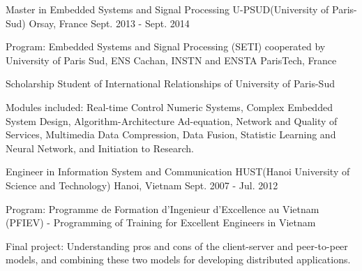 \begin{cventries}
{\begin{cvitems}
{		%
	} 
	\end{cvitems}
}

\cventry
{Master in Embedded Systems and Signal Processing} %
{U-PSUD(University of Paris-Sud)} %
{Orsay, France} %
{Sept. 2013 - Sept. 2014} %
{ %
	\begin{cvitems}
		\item {Program: Embedded Systems and Signal Processing (SETI) cooperated by University of Paris Sud, ENS Cachan, INSTN and ENSTA ParisTech, France}		
		\item {Scholarship Student of International Relationships of University of Paris-Sud}
		\item {Modules included: Real-time Control Numeric Systems, Complex Embedded System Design, Algorithm-Architecture Ad-equation, Network and Quality of Services, Multimedia Data Compression, Data Fusion, Statistic Learning and Neural Network, and Initiation to Research.}
	\end{cvitems}
}


\cventry
{Engineer in Information System and Communication} %
{HUST(Hanoi University of Science and Technology)} %
{Hanoi, Vietnam} %
{Sept. 2007 - Jul. 2012} %
{ %
\begin{cvitems}
\item {Program: Programme de Formation d'Ingenieur d'Excellence au Vietnam (PFIEV) - Programming of Training for Excellent Engineers in Vietnam}
\item {Final project: Understanding pros and cons of the client-server and peer-to-peer models, and combining these two models for developing distributed applications.}
\end{cvitems}
}


\end{cventries}